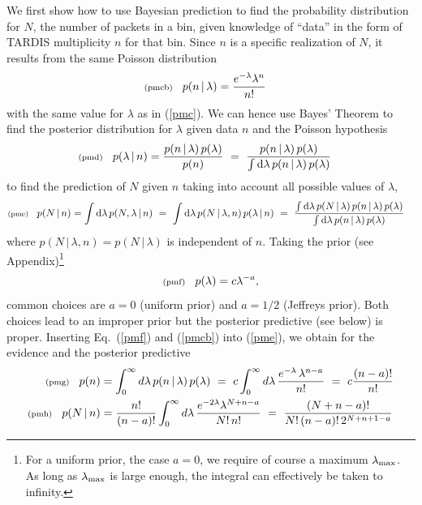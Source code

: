 \documentclass[11pt]{article}
\newcommand{\lleq}[1]{\label{#1} }
\renewcommand{\lleq}[1]{\label{#1} {\scriptstyle {\rm (#1)}} \hspace*{2ex} }
\newcommand{\cond}{\,|\,}
\newcommand{\refeq}[1]{Eq.~(\ref{#1})}
\newcommand{\rmdx}[1]{\mbox{d} #1 \,} %
\begin{document}
We first show how to use Bayesian prediction to find the probability
distribution for $N$, the number of packets in a bin, given knowledge
of ``data'' in the form of TARDIS multiplicity $n$ for that bin.
Since $n$ is a specific
realization of $N$, it results from the same Poisson distribution
\begin{align}
  \lleq{pmcb}
   p(n\cond\lambda) &= \frac{e^{-\lambda}\lambda^n}{n!}
\end{align}
with the same value for $\lambda$ as in (\ref{pmc}).  We can hence use
Bayes' Theorem to find the posterior distribution for $\lambda$ given
data $n$ and the Poisson hypothesis
\begin{align}
  \lleq{pmd}
  p(\lambda\cond n) %
  &= \frac{p(n\cond\lambda)\,p(\lambda)} {p(n)}
  \ =\ \frac{p(n\cond\lambda)\,p(\lambda)} %
  {\int \rmdx{\lambda} p(n\cond\lambda)\,p(\lambda)}
\end{align}
to find the prediction of $N$ given $n$ taking into account all
possible values of $\lambda$,
\begin{align}
  \lleq{pme}
  p(N\cond n)
  &= \int \rmdx{\lambda}p(N,\lambda\cond n)
  \ =\ \int \rmdx{\lambda} p(N\cond\lambda, n)\,p(\lambda\cond n)
  \ =\ \frac{\int \rmdx{\lambda} p(N\cond\lambda)\,p(n\cond\lambda)\,p(\lambda)}
  {\int \rmdx{\lambda} p(n\cond\lambda)\,p(\lambda)}
\end{align}
where $p(N\cond\lambda,n) = p(N\cond\lambda)$ is independent of $n$.
Taking the prior (see Appendix)\footnote{For a uniform prior,
  the case $a{=}0$, we require of course a maximum $\lambda_{\rm
    max}$. As long as $\lambda_{\rm max}$ is large enough, the
  integral can effectively be taken to infinity.}
\begin{align}
  \lleq{pmf}
  p(\lambda) = c\lambda^{-a},
\end{align}
common choices are $a=0$ (uniform prior) and $a=1/2$ (Jeffreys
prior). Both choices lead to an improper prior but the posterior
predictive (see below) is proper.
Inserting \refeq{pmf} and (\ref{pmcb}) into (\ref{pme}), we obtain for
the evidence and the posterior predictive
\begin{align}
  \lleq{pmg}
  p(n) &= %
  \int_0^\infty d\lambda\, p(n\cond\lambda)\,p(\lambda)
  \ =\
  c \int_0^\infty d\lambda\, \frac{e^{-\lambda}\,\lambda^{n-a}}{n!}
  \ =\ c\frac{(n-a)!}{n!}
  \\
  \lleq{pmh}
  p(N\cond n) %
  &= \frac{n!}{(n-a)!} \int_0^\infty d\lambda\,
  \frac{e^{-2\lambda} \lambda^{N+n-a}}{N!\, n!}
  \ =\ \frac{(N+n-a)!}{N!\,(n-a)!\,2^{N+n+1-a}}
\end{align}
\end{document}

